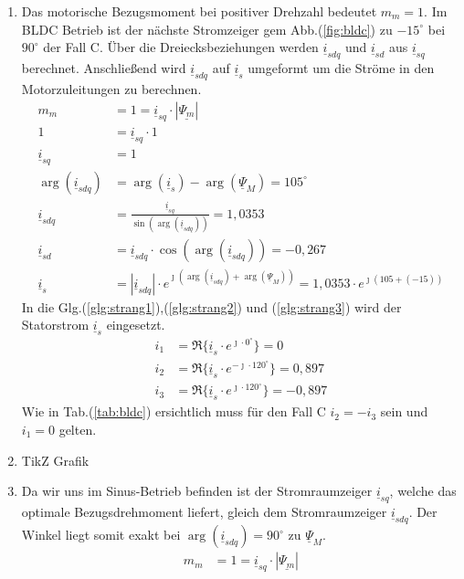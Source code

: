 \begin{solution}
\begin{enumerate}
\item Das motorische Bezugsmoment bei positiver Drehzahl bedeutet $m_m = 1$. Im BLDC Betrieb ist der nächste Stromzeiger gem Abb.(\ref{fig:bldc}) zu $-15^\circ$ bei $90^\circ$ der Fall C. Über die Dreiecksbeziehungen werden $\underline{i}_{sdq}$ und $\underline{i}_{sd}$ aus $\underline{i}_{sq}$ berechnet. Anschließend wird $\underline{i}_{sdq}$ auf $\underline{i}_{s}$ umgeformt um die Ströme in den Motorzuleitungen zu berechnen.
\begin{align}
m_m &= 1 = \underline{i}_{sq} \cdot |\underline{\Psi_m}|\\
1 &= \underline{i}_{sq} \cdot 1\\
\underline{i}_{sq} &= 1\\
\arg(\underline{i}_{sdq}) &= \arg(\underline{i}_{s}) -\arg(\underline{\Psi}_{M})=105^\circ\\
\underline{i}_{sdq} &= \frac{\underline{i}_{sq}}{\sin(\arg(\underline{i}_{sdq}))}= 1,0353\\
\underline{i}_{sd} &= \underline{i}_{sdq} \cdot \cos(\arg(\underline{i}_{sdq})) = -0,267\\
\underline{i}_{s} &= |\underline{i}_{sdq}| \cdot e^{\jmath (\arg(\underline{i}_{sdq}) + \arg(\underline{\Psi}_{M}))}= 1,0353 \cdot e^{\jmath ( 105 + (-15))}
\end{align}
In die Glg.(\ref{glg:strang1}),(\ref{glg:strang2}) und (\ref{glg:strang3}) wird der Statorstrom $\underline{i}_s$ eingesetzt.
\begin{align}
i_1 & = \Re \{ \underline{i}_s \cdot e^{\jmath \cdot 0 ^\circ} \} = 0\\
i_2 & = \Re \{ \underline{i}_s \cdot e^{-\jmath \cdot 120 ^\circ} \} = 0,897 \\
i_3 & = \Re \{ \underline{i}_s \cdot e^{\jmath \cdot 120 ^\circ} \}=  -0,897
\end{align}
Wie in Tab.(\ref{tab:bldc}) ersichtlich muss für den Fall C $i_2= -i_3$ sein und $i_1= 0$ gelten.
\item TikZ Grafik
\item Da wir uns im Sinus-Betrieb befinden ist der Stromraumzeiger $\underline{i}_{sq}$, welche das optimale Bezugsdrehmoment liefert, gleich dem Stromraumzeiger $\underline{i}_{sdq}$. Der Winkel liegt somit exakt bei $\arg(\underline{i}_{sdq})=90^\circ$ zu $\underline{\Psi}_M$.
\begin{align}
m_m &= 1 = \underline{i}_{sq} \cdot |\underline{\Psi_m}|\\

\end{align}
\end{enumerate}
\end{solution}
